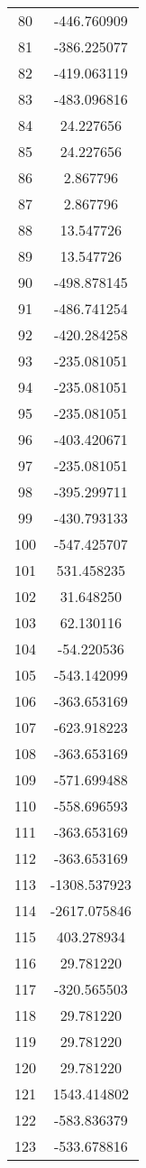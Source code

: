 \documentclass[12pt]{article}
\begin{document}
\begin{longtable}{@{}cc@{}}
80 & -446.760909 \\
81 & -386.225077 \\
82 & -419.063119 \\
83 & -483.096816 \\
84 & 24.227656 \\
85 & 24.227656 \\
86 & 2.867796 \\
87 & 2.867796 \\
88 & 13.547726 \\
89 & 13.547726 \\
90 & -498.878145 \\
91 & -486.741254 \\
92 & -420.284258 \\
93 & -235.081051 \\
94 & -235.081051 \\
95 & -235.081051 \\
96 & -403.420671 \\
97 & -235.081051 \\
98 & -395.299711 \\
99 & -430.793133 \\
100 & -547.425707 \\
101 & 531.458235 \\
102 & 31.648250 \\
103 & 62.130116 \\
104 & -54.220536 \\
105 & -543.142099 \\
106 & -363.653169 \\
107 & -623.918223 \\
108 & -363.653169 \\
109 & -571.699488 \\
110 & -558.696593 \\
111 & -363.653169 \\
112 & -363.653169 \\
113 & -1308.537923 \\
114 & -2617.075846 \\
115 & 403.278934 \\
116 & 29.781220 \\
117 & -320.565503 \\
118 & 29.781220 \\
119 & 29.781220 \\
120 & 29.781220 \\
121 & 1543.414802 \\
122 & -583.836379 \\
123 & -533.678816 \\

\end{longtable}
\end{document}
